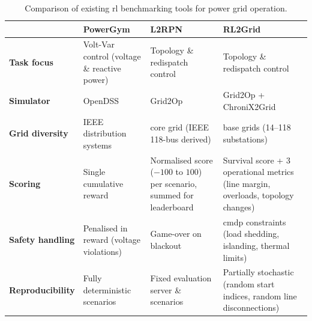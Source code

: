 \begin{table}[htp]
    \centering
    \caption{Comparison of existing \ac{rl} benchmarking tools for power grid operation.}
    \label{tab:power-grid-benchmarks}
    \small
    \renewcommand{\arraystretch}{1.1}
    \begin{tabularx}{\textwidth}{@{}l>{\raggedright\arraybackslash}X>{\raggedright\arraybackslash}X>{\raggedright\arraybackslash}X@{}}
        \toprule
        & \textbf{PowerGym} & \textbf{L2RPN} & \textbf{RL2Grid} \\
        \midrule
        \textbf{Task focus} & Volt-Var control (voltage \& reactive power) & Topology \& redispatch control & Topology \& redispatch control \\ \midrule
        \textbf{Simulator} & OpenDSS & Grid2Op & Grid2Op + ChroniX2Grid \\ \midrule
        \textbf{Grid diversity} & 4 IEEE distribution systems & 1 core grid (IEEE 118-bus derived) & 7 base grids (14--118 substations) \\ \midrule
        \textbf{Scoring} & Single cumulative reward & Normalised score ($-100$ to $100$) per scenario, summed for leaderboard & Survival score + 3 operational metrics (line margin, overloads, topology changes) \\ \midrule
        \textbf{Safety handling} & Penalised in reward (voltage violations) & Game-over on blackout & \ac{cmdp} constraints (load shedding, islanding, thermal limits) \\ \midrule
        \textbf{Reproducibility} & Fully deterministic scenarios & Fixed evaluation server \& scenarios & Partially stochastic (random start indices, random line disconnections) \\
        \bottomrule
    \end{tabularx}
\end{table}